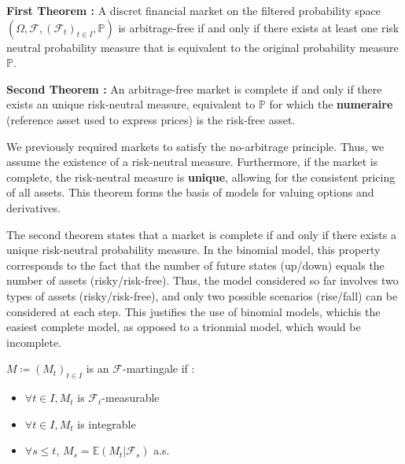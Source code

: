 \bigskip

\begin{definitionbox}[frametitle = {Fundamental Theorems of Asset Pricing}]
    \textbf{First Theorem : } A discret financial market on the filtered probability space \\
    $(\Omega, \mathcal{F}, (\mathcal{F}_t)_{t \in I}, \mathbb{P})$ is arbitrage-free 
    if and only if there exists at least one risk neutral probability measure that is equivalent to the original probability measure $\mathbb{P}$.

    \textbf{Second Theorem : } An arbitrage-free market is complete if and only if there exists an unique risk-neutral measure,
    equivalent to $\mathbb{P}$ for which the \textbf{numeraire} (reference asset used to express prices) is the risk-free asset.
\end{definitionbox} \cite{FundamentalTheorems} \cite{FundamentalTheorem} \cite{Martingales}

\bigskip

\remark
We previously required markets to satisfy the no-arbitrage principle. Thus, we assume the existence of a risk-neutral measure.
Furthermore, if the market is complete, the risk-neutral measure is \textbf{unique}, allowing for the consistent pricing of all assets.
This theorem forms the basis of models for valuing options and derivatives.

The second theorem states that a market is complete if and only if there exists a unique risk-neutral probability measure.
In the binomial model, this property corresponds to the fact that the number of future states (up/down) equals the number of assets (risky/risk-free).
Thus, the model considered so far involves two types of assets (risky/risk-free), and only two possible scenarios (rise/fall) can be considered at each step.
This justifies the use of binomial models, whichis the easiest complete model, as opposed to a trionmial model, which would be incomplete.

\bigskip

\begin{definitionbox}[frametitle = {Martingale}]
    $M \coloneq (M_t)_{t \in I}$ is an $\mathcal{F}$-martingale if : 
    \begin{itemize}
        \item $\forall t \in I, M_t$ is $\mathcal{F}_t$-measurable
        \item $\forall t \in I, M_t$ is integrable 
        \item $\forall s \le t$, $M_{s} = \mathbb{E}(M_{t} | \mathcal{F}_{s})$ a.s.
    \end{itemize}
\end{definitionbox}


